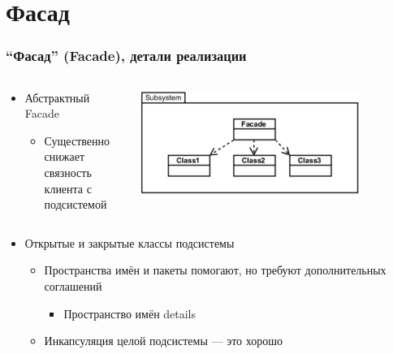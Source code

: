 \documentclass[xetex,mathserif,serif]{beamer}
\begin{document}
    \section{Фасад}

    \begin{frame}
        \frametitle{``Фасад'' (Facade), детали реализации}
        \begin{columns}
            \begin{column}{0.5\textwidth}
                \begin{itemize}
                    \item Абстрактный Facade
                    \begin{itemize}
                        \item Существенно снижает связность клиента с подсистемой
                    \end{itemize}
                \end{itemize}
            \end{column}
            \begin{column}{0.5\textwidth}
                \begin{center}
                    \includegraphics[width=0.8\textwidth]{facade.png}
                \end{center}
            \end{column}
        \end{columns}
        \begin{itemize}
            \item Открытые и закрытые классы подсистемы
            \begin{itemize}
                \item Пространства имён и пакеты помогают, но требуют дополнительных соглашений
                \begin{itemize}
                    \item Пространство имён details
                \end{itemize}
                \item Инкапсуляция целой подсистемы --- это хорошо
            \end{itemize}
        \end{itemize}
    \end{frame}
\end{document}
